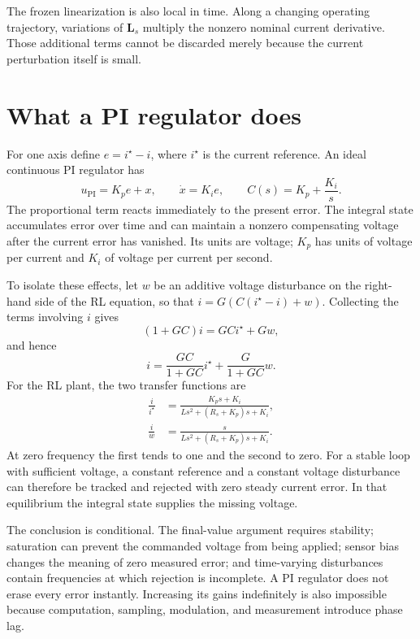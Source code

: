 The frozen linearization is also local in time. Along a changing operating trajectory, variations of $\bm L_s$ multiply the nonzero nominal current derivative. Those additional terms cannot be discarded merely because the current perturbation itself is small.

\section{What a PI regulator does}

For one axis define $e=i^\star-i$, where $i^\star$ is the current reference. An ideal continuous PI regulator has
\begin{equation}
 u_{\mathrm{PI}}=K_pe+x,
 \qquad \dot x=K_ie,
 \qquad C(s)=K_p+\frac{K_i}{s}.
 \label{eq:control-pi}
\end{equation}
The proportional term reacts immediately to the present error. The integral state accumulates error over time and can maintain a nonzero compensating voltage after the current error has vanished. Its units are voltage; $K_p$ has units of voltage per current and $K_i$ of voltage per current per second.

To isolate these effects, let $w$ be an additive voltage disturbance on the right-hand side of the RL equation, so that $i=G(C(i^\star-i)+w)$. Collecting the terms involving $i$ gives
\begin{equation}
 (1+GC)i=GCi^\star+Gw,
\end{equation}
and hence
\begin{equation}
 i=\frac{GC}{1+GC}i^\star+\frac{G}{1+GC}w.
 \label{eq:control-reference-disturbance}
\end{equation}
For the RL plant, the two transfer functions are
\begin{align}
 \frac{i}{i^\star}&=
 \frac{K_ps+K_i}{Ls^2+(R_s+K_p)s+K_i},\\
 \frac{i}{w}&=
 \frac{s}{Ls^2+(R_s+K_p)s+K_i}.
 \label{eq:control-closed-rl}
\end{align}
At zero frequency the first tends to one and the second to zero. For a stable loop with sufficient voltage, a constant reference and a constant voltage disturbance can therefore be tracked and rejected with zero steady current error. In that equilibrium the integral state supplies the missing voltage.

The conclusion is conditional. The final-value argument requires stability; saturation can prevent the commanded voltage from being applied; sensor bias changes the meaning of zero measured error; and time-varying disturbances contain frequencies at which rejection is incomplete. A PI regulator does not erase every error instantly. Increasing its gains indefinitely is also impossible because computation, sampling, modulation, and measurement introduce phase lag.

